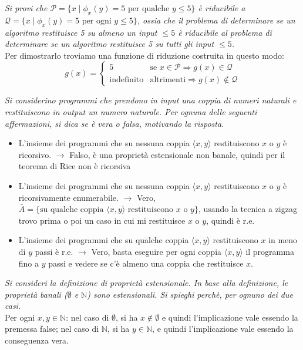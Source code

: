 \documentclass[12pt, a4paper]{report}
\begin{document}
        \begin{exercise}
            \textit{Si provi che $\mathcal{P}=\{x\mid\phi_x(y)=5 \text{ per qualche }y\leq 5\}$ è riducibile a $\mathcal{Q}=\{x\mid\phi_x(y)=5 \text{ per ogni } y\leq 5\}$, ossia che il problema di determinare se un algoritmo restituisce 5 su almeno un input $\leq 5$ è riducibile al problema di determinare se un algoritmo restituisce 5 su tutti gli input $\leq 5$.}\\
            Per dimostrarlo troviamo una funzione di riduzione costruita in questo modo:
            $$
            g(x)=\begin{cases}
                5 & \text{se } x\in\mathcal{P}\Rightarrow g(x)\in\mathcal{Q}\\
                \text{indefinito} & \text{altrimenti}\Rightarrow g(x)\notin\mathcal{Q}
            \end{cases}
            $$
        \end{exercise}
        \begin{exercise}
            \textit{Si considerino programmi che prendono in input una coppia di numeri naturali e restituiscono in output un numero naturale. Per ognuna delle seguenti affermazioni, si dica se è vera o falsa, motivando la risposta.}
            \begin{itemize}
                \item L'insieme dei programmi che su nessuna coppia $\langle x,y\rangle$ restituiscono $x$ o $y$ è ricorsivo. $\rightarrow$ Falso, è una proprietà estensionale non banale, quindi per il teorema di Rice non è ricorsiva
                \item L'insieme dei programmi che su nessuna coppia $\langle x,y\rangle$ restituiscono $x$ o $y$ è ricorsivamente enumerabile. $\rightarrow$ Vero, $\bar{A}=\{\text{su qualche coppia } \langle x,y\rangle \text{ restituiscono } x \text{ o } y\}$, usando la tecnica a zigzag trovo prima o poi un caso in cui mi restituisce $x$ o $y$, quindi è r.e.
                \item L'insieme dei programmi che su qualche coppia $\langle x,y\rangle$ restituiscono $x$ in meno di $y$ passi è r.e. $\rightarrow$ Vero, basta eseguire per ogni coppia $\langle x,y\rangle$ il programma fino a $y$ passi e vedere se c'è almeno una coppia che restituisce $x$.
            \end{itemize}
        \end{exercise}
        \begin{exercise}
        \textit{Si consideri la definizione di proprietà estensionale. In base alla definizione, le proprietà banali ($\emptyset$ e $\mathbb{N}$) sono estensionali. Si spieghi perchè, per ognuno dei due casi.}\\
        Per ogni $x,y\in\mathbb{N}$: nel caso di $\emptyset$, si ha $x\notin\emptyset$ e quindi l'implicazione vale essendo la premessa false; nel caso di $\mathbb{N}$, si ha $y\in\mathbb{N}$, e quindi l'implicazione vale essendo la conseguenza vera. 
        \end{exercise}
\end{document}
